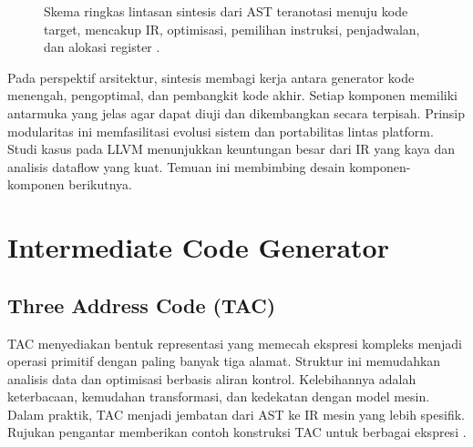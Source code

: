\documentclass[../main.tex]{subfiles}
\begin{document}
\begin{figure}[t]
  \centering
  \caption{Skema ringkas lintasan sintesis dari AST teranotasi menuju kode target, mencakup IR, optimisasi, pemilihan instruksi, penjadwalan, dan alokasi register \citep{LLVMOverview}.}
  \label{fig:synthesis-pipeline}
\end{figure}

Pada perspektif arsitektur, sintesis membagi kerja antara generator kode menengah, pengoptimal, dan pembangkit kode akhir. Setiap komponen memiliki antarmuka yang jelas agar dapat diuji dan dikembangkan secara terpisah. Prinsip modularitas ini memfasilitasi evolusi sistem dan portabilitas lintas platform. Studi kasus pada LLVM menunjukkan keuntungan besar dari IR yang kaya dan analisis dataflow yang kuat. Temuan ini membimbing desain komponen-komponen berikutnya.

\section{Intermediate Code Generator}
\subsection{Three Address Code (TAC)}
TAC menyediakan bentuk representasi yang memecah ekspresi kompleks menjadi operasi primitif dengan paling banyak tiga alamat. Struktur ini memudahkan analisis data dan optimisasi berbasis aliran kontrol. Kelebihannya adalah keterbacaan, kemudahan transformasi, dan kedekatan dengan model mesin. Dalam praktik, TAC menjadi jembatan dari AST ke IR mesin yang lebih spesifik. Rujukan pengantar memberikan contoh konstruksi TAC untuk berbagai ekspresi \citep{WikiTAC}.
\end{document}
